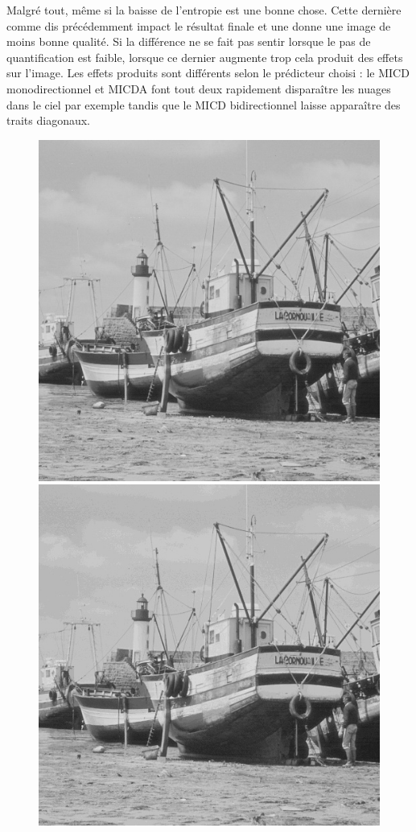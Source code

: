 \documentclass[12pt]{report}
\begin{document}
Malgré tout, même si la baisse de l'entropie est une bonne chose. Cette dernière comme dis précédemment impact le résultat finale et une donne une image de moins bonne qualité. Si la différence ne se fait pas sentir lorsque le pas de quantification est faible, lorsque ce dernier augmente trop cela produit des effets sur l'image. Les effets produits sont différents selon le prédicteur choisi : le MICD monodirectionnel et MICDA font tout deux rapidement disparaître les nuages dans le ciel par exemple tandis que le MICD bidirectionnel laisse apparaître des traits diagonaux.

\begin{figure}[H]
\begin{center}
\includegraphics[scale=0.25]{../ImageRes/ImagedecodeeMICDmonoQ2.jpg} 
\includegraphics[scale=0.25]{../ImageRes/ImagedecodeeMICDmonoQ8.jpg} 

\end{center}
\end{figure}
\end{document}
